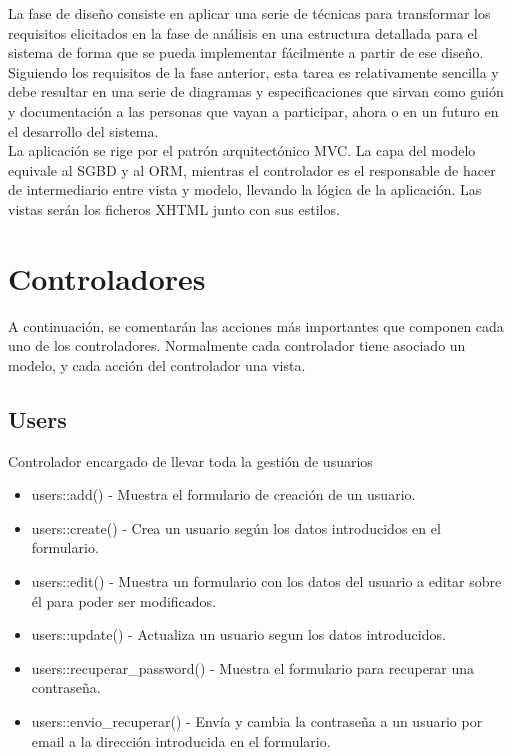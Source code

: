 La fase de diseño consiste en aplicar una serie de técnicas para transformar los requisitos elicitados en la fase de análisis en una estructura detallada para el sistema de forma que se pueda implementar fácilmente a partir de ese diseño.\\

Siguiendo los requisitos de la fase anterior, esta tarea es relativamente sencilla y debe resultar en una serie de diagramas y especificaciones que sirvan como guión y documentación a las personas que vayan a participar, ahora o en un futuro en el desarrollo del sistema.\\

La aplicación se rige por el patrón arquitectónico MVC. La capa del modelo equivale al SGBD y al ORM, mientras el controlador es el responsable de hacer de intermediario entre vista y modelo, llevando la lógica de la aplicación. Las vistas serán los ficheros XHTML junto con sus estilos.

\section{Controladores}

A continuación, se comentarán las acciones más importantes que componen cada uno de los controladores. Normalmente cada controlador tiene asociado un modelo, y cada acción del controlador una vista.

\subsection{Users}

Controlador encargado de llevar toda la gestión de usuarios

\begin{itemize}
\item users::add() - Muestra el formulario de creación de un usuario.
\item users::create() - Crea un usuario según los datos introducidos en el formulario.
\item users::edit() - Muestra un formulario con los datos del usuario a editar sobre él para poder ser modificados.
\item users::update() - Actualiza un usuario segun los datos introducidos.
\item users::recuperar\_password() - Muestra el formulario para recuperar una contraseña.
\item users::envio\_recuperar() - Envía y cambia la contraseña a un usuario por email a la dirección introducida en el formulario.
\end{itemize}

